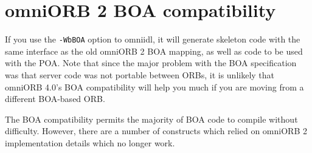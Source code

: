 \documentclass[11pt,twoside,a4paper]{book}
\newcommand{\cmdline}[1]{\texttt{#1}}
\begin{document}
\section{omniORB 2 BOA compatibility}
\label{sec:BOAcompat}

If you use the \cmdline{-WbBOA} option to omniidl, it will generate
skeleton code with the same interface as the old omniORB 2 BOA
mapping, as well as code to be used with the POA. Note that since the
major problem with the BOA specification was that server code was not
portable between ORBs, it is unlikely that omniORB 4.0's BOA
compatibility will help you much if you are moving from a different
BOA-based ORB.

The BOA compatibility permits the majority of BOA code to compile
without difficulty. However, there are a number of constructs which
relied on omniORB 2 implementation details which no longer work.
\end{document}
